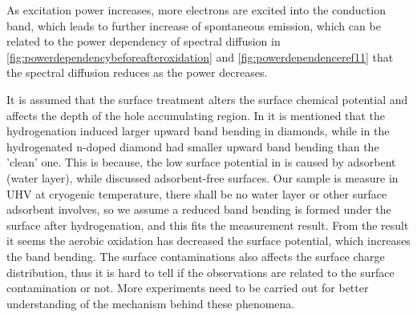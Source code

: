 As excitation power increases, more electrons are excited into the conduction band, which leads to further increase of spontaneous emission, which can be related to the power dependency of spectral diffusion in \ref{fig:powerdependencybeforeafteroxidation} and  \ref{fig:powerdependenceref11} that the spectral diffusion reduces as the power decreases.

It is assumed that the surface treatment alters the surface chemical potential and affects the depth of  the hole accumulating region. In \citep{stacey_depletion_2012} it is mentioned that the hydrogenation induced larger upward band bending in diamonds, while in \citep{diederich_electron_1998} the hydrogenated n-doped diamond had smaller upward band bending than the 'clean' one. This is because, the low surface potential in \citep{stacey_depletion_2012} is caused by adsorbent (water layer), while \citep{diederich_electron_1998} discussed adsorbent-free surfaces. Our sample is measure in UHV at cryogenic temperature, there shall be no water layer or other surface adsorbent involves, so we assume a reduced band bending is formed under the surface after hydrogenation, and this fits the measurement result. From the result it seems the aerobic oxidation has decreased the surface potential, which increases the band bending. The surface contaminations also affects the surface charge distribution, thus it is hard to tell if the observations are related to the surface contamination or not. More experiments need to be carried out for better understanding of the mechanism behind these phenomena. 




